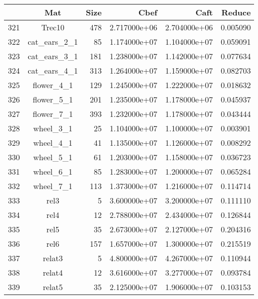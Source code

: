 \documentclass[8pt]{report}
\begin{document}
	\begin{table*}
	\center
		\begin{tabular}{|l|c|r|r|r|r|}
\toprule
{} &                      Mat &  Size &          Cbef &          Caft &    Reduce \\
\midrule
321 &                   Trec10 &   478 &  2.717000e+06 &  2.704000e+06 &  0.005090 \\
322 &             cat\_ears\_2\_1 &    85 &  1.174000e+07 &  1.104000e+07 &  0.059091 \\
323 &             cat\_ears\_3\_1 &   181 &  1.238000e+07 &  1.142000e+07 &  0.077634 \\
324 &             cat\_ears\_4\_1 &   313 &  1.264000e+07 &  1.159000e+07 &  0.082703 \\
325 &               flower\_4\_1 &   129 &  1.245000e+07 &  1.222000e+07 &  0.018632 \\
326 &               flower\_5\_1 &   201 &  1.235000e+07 &  1.178000e+07 &  0.045937 \\
327 &               flower\_7\_1 &   393 &  1.232000e+07 &  1.178000e+07 &  0.043444 \\
328 &                wheel\_3\_1 &    25 &  1.104000e+07 &  1.100000e+07 &  0.003901 \\
329 &                wheel\_4\_1 &    41 &  1.135000e+07 &  1.126000e+07 &  0.008292 \\
330 &                wheel\_5\_1 &    61 &  1.203000e+07 &  1.158000e+07 &  0.036723 \\
331 &                wheel\_6\_1 &    85 &  1.283000e+07 &  1.200000e+07 &  0.065284 \\
332 &                wheel\_7\_1 &   113 &  1.373000e+07 &  1.216000e+07 &  0.114714 \\
333 &                     rel3 &     5 &  3.600000e+07 &  3.200000e+07 &  0.111110 \\
334 &                     rel4 &    12 &  2.788000e+07 &  2.434000e+07 &  0.126844 \\
335 &                     rel5 &    35 &  2.673000e+07 &  2.127000e+07 &  0.204316 \\
336 &                     rel6 &   157 &  1.657000e+07 &  1.300000e+07 &  0.215519 \\
337 &                   relat3 &     5 &  4.800000e+07 &  4.267000e+07 &  0.110944 \\
338 &                   relat4 &    12 &  3.616000e+07 &  3.277000e+07 &  0.093784 \\
339 &                   relat5 &    35 &  2.125000e+07 &  1.906000e+07 &  0.103153 \\

\end{tabular}
\end{table*}
\end{document}
